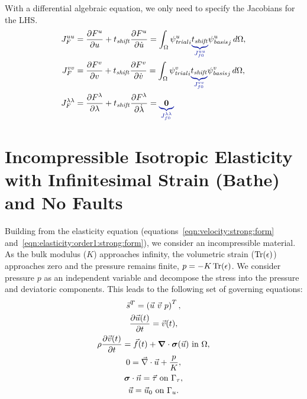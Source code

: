 With a differential algebraic equation, we only need to specify the Jacobians for the LHS.
\begin{align}
  J_F^{uu} &= \frac{\partial F^u}{\partial u} + t_\mathit{shift} \frac{\partial F^u}{\partial \dot{u}}
  = \int_\Omega \trialscalar[u]_i \eqnannotate{t_\mathit{shift}}{J_{f0}^{uu}} \basisscalar[u]_j \, d\Omega, \\
%
  J_F^{vv} &= \frac{\partial F^v}{\partial v}  + t_\mathit{shift} \frac{\partial F^v}{\partial \dot{v}}
  = \int_\Omega \trialscalar[v]_i \eqnannotate{t_\mathit{shift}}{J_{f0}^{vv}} \basisscalar[v]_j \, d\Omega, \\
%
  J_F^{\lambda \lambda} &= \frac{\partial F^\lambda}{\partial \lambda} + t_\mathit{shift} \frac{\partial F^\lambda}{\partial \dot{\lambda}}
  = \eqnannotate{\tensor{0}}{J_{f0}^{\lambda \lambda}}
\end{align}

\section{Incompressible Isotropic Elasticity with Infinitesimal Strain (Bathe) and No Faults}


Building from the elasticity equation
(equations~\ref{eqn:velocity:strong:form}
and~\ref{eqn:elasticity:order1:strong:form}), we consider an
incompressible material. As the bulk modulus ($K$) approaches
infinity, the volumetric strain ($\operatorname{Tr}(\epsilon)$) approaches zero and
the pressure remains finite, $p = -K \operatorname{Tr}(\epsilon)$. We consider
pressure $p$ as an independent variable and decompose the stress into the
pressure and deviatoric components. This leads to the following set of
governing equations:
\begin{gather}
  \vec{s}^T = \left( \vec{u} \ \vec{v} \ p \right)^T, \\
  \frac{\partial\vec{u}(t)}{\partial t} = \vec{v}(t), \\
  \rho \frac{\partial\vec{v}(t)}{\partial t} = \vec{f}(t) + \bm{\nabla} \cdot 
\bm{\sigma}(\vec{u}) 
\text{ in }\Omega, \\
  0 = \vec{\nabla} \cdot \vec{u} + \frac{p}{K}, \\
  \bm{\sigma} \cdot \vec{n} = \vec{\tau} \text{ on }\Gamma_\tau, \\
  \vec{u} = \vec{u}_0 \text{ on }\Gamma_u.
\end{gather}

